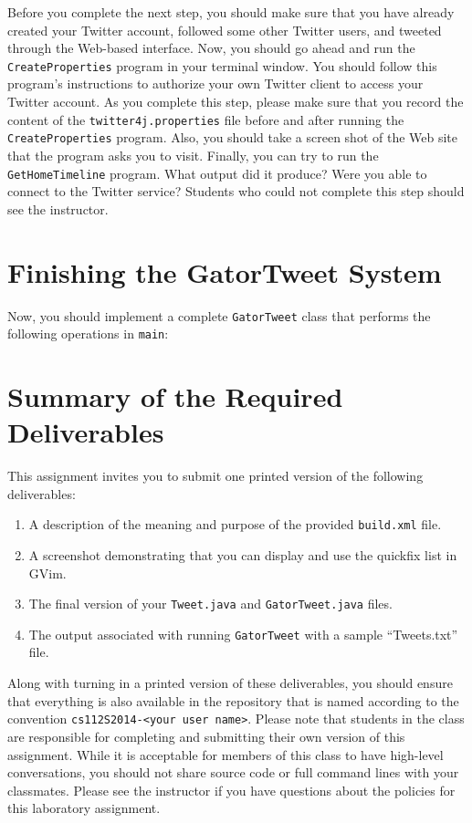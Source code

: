 Before you complete the next step, you should make sure that you have already created your Twitter account, followed some other
Twitter users, and tweeted through the Web-based interface. Now, you should go ahead and run the {\tt CreateProperties} program in
your terminal window.  You should follow this program's instructions to authorize your own Twitter client to access your Twitter
account.  As you complete this step, please make sure that you record the content of the {\tt twitter4j.properties} file before
and after running the {\tt CreateProperties} program.  Also, you should take a screen shot of the Web site that the program asks
you to visit. Finally, you can try to run the {\tt GetHomeTimeline} program.  What output did it produce? Were you able to connect
to the Twitter service? Students who could not complete this step should see the instructor.

\section*{Finishing the GatorTweet System}

Now, you should implement a complete {\tt GatorTweet} class that performs the following operations in {\tt main}:


\section*{Summary of the Required Deliverables}

  This assignment invites you to submit one printed version of the following deliverables: 

  \begin{enumerate}
    \item A description of the meaning and purpose of the provided {\tt build.xml} file.
    \item A screenshot demonstrating that you can display and use the quickfix list in GVim.
    \item The final version of your {\tt Tweet.java} and {\tt GatorTweet.java} files.
    \item The output associated with running {\tt GatorTweet} with a sample ``Tweets.txt'' file.
  \end{enumerate}

  Along with turning in a printed version of these deliverables, you should ensure that everything is also available in the
  repository that is named according to the convention {\tt cs112S2014-<your user name>}. Please note that students in the class
  are responsible for completing and submitting their own version of this assignment.    While it is acceptable for members of
  this class to have high-level conversations, you should not share source code or full command lines with your classmates.
  Please see the instructor if you have questions about the policies for this laboratory assignment.

  
